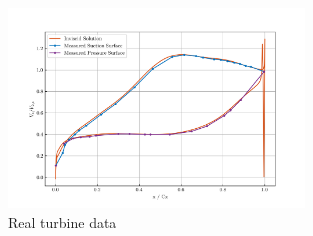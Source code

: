 \documentclass{article}
\begin{document}
\begin{figure}[H]
    \centering
    \includegraphics[width=0.7\textwidth]{figures/turbine_real.png}
    \caption{Real turbine data \cite{4A3_lab}}
    \label{fig:turbine_real}
\end{figure}
\end{document}
